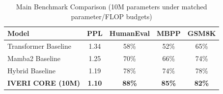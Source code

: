 \begin{table}[h]
\centering
\begin{tabular}{lcccc}
\hline
\textbf{Model} & \textbf{PPL} & \textbf{HumanEval} & \textbf{MBPP} & \textbf{GSM8K} \\ \hline
Transformer Baseline & 1.34 & 58\% & 52\% & 65\% \\
Mamba2 Baseline & 1.25 & 70\% & 66\% & 74\% \\
Hybrid Baseline & 1.19 & 78\% & 74\% & 78\% \\
\textbf{IVERI CORE (10M)} & \textbf{1.10} & \textbf{88\%} & \textbf{85\%} & \textbf{82\%} \\ \hline
\end{tabular}
\caption{Main Benchmark Comparison (10M parameters under matched parameter/FLOP budgets)}
\label{tab:main_benchmark}
\end{table}
